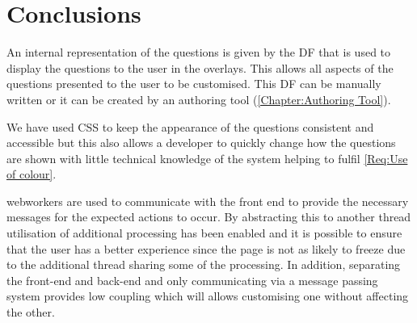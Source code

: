 \section{Conclusions}

An internal representation of the questions is given by the \gls{DF} that is used to display the questions to the user in the overlays. This allows all aspects of the questions presented to the user to be customised. This \gls{DF} can be manually written or it can be created by an authoring tool (\autoref{Chapter:Authoring Tool}).

We have used \gls{CSS} to keep the appearance of the questions consistent and accessible but this also allows a developer to quickly change how the questions are shown with little technical knowledge of the system helping to fulfil \cref{Req:Use of colour}.

\Glspl{webworker} are used to communicate with the front end to provide the necessary messages for the expected actions to occur. By abstracting this to another thread utilisation of additional processing has been enabled and it is possible to ensure that the user has a better experience since the page is not as likely to freeze due to the additional thread sharing some of the processing. In addition, separating the front-end and back-end and only communicating via a message passing system provides low coupling which will allows customising one without affecting the other.
